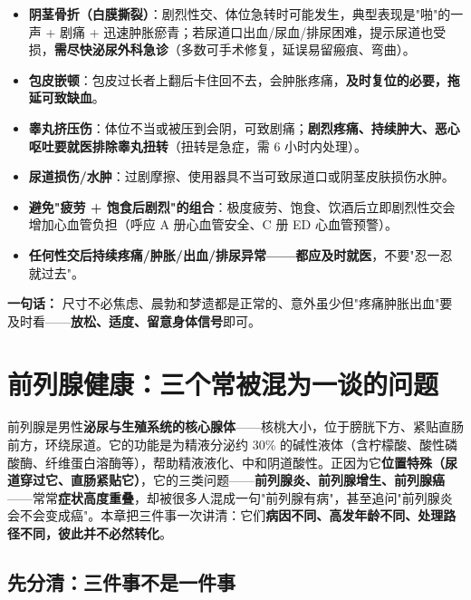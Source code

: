 \documentclass[12pt,UTF8,openany]{ctexbook}
\begin{document}
\begin{itemize}[leftmargin=2em,itemsep=0.3em]
  \item \textbf{阴茎骨折（白膜撕裂）}：剧烈性交、体位急转时可能发生，典型表现是"啪"的一声 + 剧痛 + 迅速肿胀瘀青；若尿道口出血/尿血/排尿困难，提示尿道也受损，\textbf{需尽快泌尿外科急诊}（多数可手术修复，延误易留瘢痕、弯曲）。
  \item \textbf{包皮嵌顿}：包皮过长者上翻后卡住回不去，会肿胀疼痛，\textbf{及时复位的必要，拖延可致缺血}。
  \item \textbf{睾丸挤压伤}：体位不当或被压到会阴，可致剧痛；\textbf{剧烈疼痛、持续肿大、恶心呕吐要就医排除睾丸扭转}（扭转是急症，需 6 小时内处理）。
  \item \textbf{尿道损伤/水肿}：过剧摩擦、使用器具不当可致尿道口或阴茎皮肤损伤水肿。
  \item \textbf{避免"疲劳 + 饱食后剧烈"的组合}：极度疲劳、饱食、饮酒后立即剧烈性交会增加心血管负担（呼应 A 册心血管安全、C 册 ED 心血管预警）。
  \item \textbf{任何性交后持续疼痛/肿胀/出血/排尿异常——都应及时就医}，不要"忍一忍就过去"。
\end{itemize}

\noindent\textbf{一句话：} 尺寸不必焦虑、晨勃和梦遗都是正常的、意外虽少但"疼痛肿胀出血"要及时看——\textbf{放松、适度、留意身体信号}即可。

\chapter{前列腺健康：三个常被混为一谈的问题}
\label{chap:prostate}

前列腺是男性\textbf{泌尿与生殖系统的核心腺体}——核桃大小，位于膀胱下方、紧贴直肠前方，环绕尿道。它的功能是为精液分泌约 30\% 的碱性液体（含柠檬酸、酸性磷酸酶、纤维蛋白溶酶等），帮助精液液化、中和阴道酸性。正因为它\textbf{位置特殊（尿道穿过它、直肠紧贴它）}，它的三类问题——\textbf{前列腺炎、前列腺增生、前列腺癌}——常常\textbf{症状高度重叠}，却被很多人混成一句"前列腺有病"，甚至追问"前列腺炎会不会变成癌"。本章把三件事一次讲清：它们\textbf{病因不同、高发年龄不同、处理路径不同，彼此并不必然转化}。

\section{先分清：三件事不是一件事}
\end{document}
